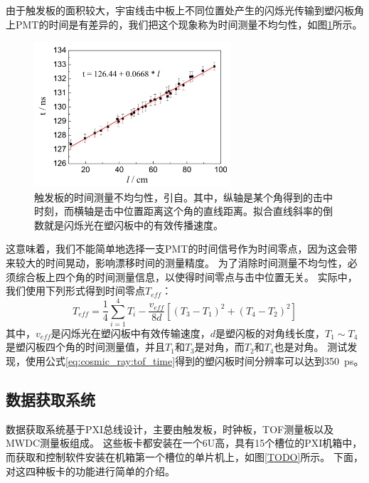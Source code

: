 由于触发板的面积较大，宇宙线击中板上不同位置处产生的闪烁光传输到塑闪板角上PMT的时间是有差异的，我们把这个现象称为时间测量不均匀性，如图\ref{fig:cosmic_ray:tof_timeVSposition}所示。
\begin{figure}[htbp]
	\centering
	\includegraphics[width=0.65\textwidth]{chap/cosmic_ray/fig/tof_timeVSposition.png}
	\caption{触发板的时间测量不均匀性，引自\parencite{tang_large_2015}。其中，纵轴是某个角得到的击中时刻，而横轴是击中位置距离这个角的直线距离。拟合直线斜率的倒数就是闪烁光在塑闪板中的有效传播速度。}
	\label{fig:cosmic_ray:tof_timeVSposition}
\end{figure}
这意味着，我们不能简单地选择一支PMT的时间信号作为时间零点，因为这会带来较大的时间晃动，影响漂移时间的测量精度。
为了消除时间测量不均匀性，必须综合板上四个角的时间测量信息，以使得时间零点与击中位置无关。
实际中，我们使用下列形式\parencite{annand_large_1987}得到时间零点$T_{eff}$：
\begin{equation}
	T_{eff} = \frac{1}{4}\sum^4_{i=1}T_i - \frac{v_{eff}}{8d}[(T_3-T_1)^2+(T_4-T_2)^2]
	\label{eq:cosmic_ray:tof_time}
\end{equation}
其中，$v_{eff}$是闪烁光在塑闪板中有效传输速度，$d$是塑闪板的对角线长度，$T_1\sim T_4$是塑闪板四个角的时间测量值，并且$T_1$和$T_3$是对角，而$T_2$和$T_4$也是对角。
测试发现，使用公式\ref{eq:cosmic_ray:tof_time}得到的塑闪板时间分辨率可以达到\SI{350}{\pico\second}\parencite{tang_large_2015}。

\subsection{数据获取系统}
\label{sec:cosmic_ray:daq_system}
数据获取系统基于PXI总线设计，主要由触发板，时钟板，TOF测量板以及MWDC测量板组成\parencite{kanglongfei_thesis,zhoujiawen_thesis}。
这些板卡都安装在一个6U高，具有15个槽位的PXI机箱中\parencite{pxi_chassis}，而获取和控制软件安装在机箱第一个槽位的单片机上，如图\ref{TODO}所示。
下面，对这四种板卡的功能进行简单的介绍。

